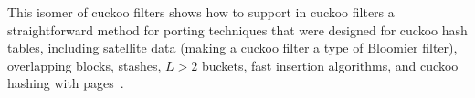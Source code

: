 \documentclass[letterpaper,twocolumn,10pt]{article}
\newcommand{\etal}{et al.}
\newcommand{\TCF}{SCF}
\newcommand{\TCF}{TCF}
\begin{document}
This isomer of cuckoo filters shows how to support in cuckoo filters a straightforward method for porting techniques that were designed for cuckoo hash tables, including satellite data (making a cuckoo filter a type of Bloomier filter), overlapping blocks, stashes, $L > 2$ buckets, fast insertion algorithms, and cuckoo hashing with pages~\cite{cuckoo-simple,cuckoo-overlap,stash,d-ary,d-ary-filter,vertical,bloomier,cuckoo-linear-insertion,cuckoo-simd-insert,cuckoo-pages,cuckoo-pages-non-contiguous}.







\end{document}
